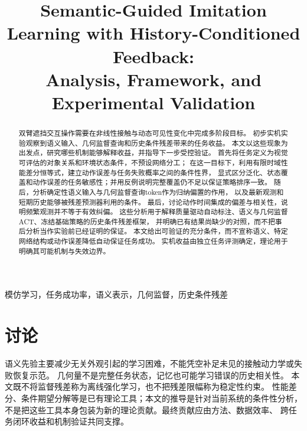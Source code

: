 \documentclass[journal,10pt]{IEEEtran}
\title{Semantic-Guided Imitation Learning with History-Conditioned Feedback:\\Analysis, Framework, and Experimental Validation}
\author{}
\begin{document}
\maketitle
\begin{abstract}
双臂遮挡交互操作需要在非线性接触与动态可见性变化中完成多阶段目标。
初步实机实验观察到语义输入、几何监督查询和历史条件残差带来的任务收益。
本文以这些现象为出发点，研究哪些机制能够解释收益，并指导下一步受控验证。
首先将任务定义为视觉可评估的对象关系和环境状态条件，不预设网络分工；
在这一目标下，利用有限时域性能差分恒等式，建立动作误差与任务失败概率之间的条件性界，
显式区分泛化、状态覆盖和动作误差的任务敏感性；并用反例说明完整覆盖仍不足以保证策略排序一致。
随后，分析确定性语义输入与几何监督查询token作为归纳偏置的作用，
以及最新观测和短期历史能够被残差预测器利用的条件。
最后，讨论动作时间集成的偏差与相关性，说明频繁观测并不等于有效纠偏。
这些分析用于解释质量驱动自动标注、语义与几何监督ACT、冻结基础策略的历史条件残差框架，
并明确已有结果尚缺少的对照，而不把事后分析当作实验前已经证明的保证。
本文给出可验证的充分条件，而不宣称语义、特定网络结构或动作误差降低自动保证任务成功。
实机收益由独立任务评测确定，理论用于明确其可能机制与失效边界。
\end{abstract}
\begin{IEEEkeywords}
模仿学习，任务成功率，语义表示，几何监督，历史条件残差
\end{IEEEkeywords}







\section{讨论}
语义先验主要减少无关外观引起的学习困难，不能凭空补足未见的接触动力学或失败恢复示范。
几何量不是完整任务状态，记忆也可能学习错误的历史相关性。
本文既不将监督残差称为离线强化学习，也不把残差限幅称为稳定性约束。
性能差分、条件期望分解等是已有理论工具；本文的推导是针对当前系统的条件性分析，
不是把这些工具本身包装为新的理论贡献。最终贡献应由方法、数据效率、
跨任务闭环收益和机制验证共同支撑。
\appendices



\end{document}
